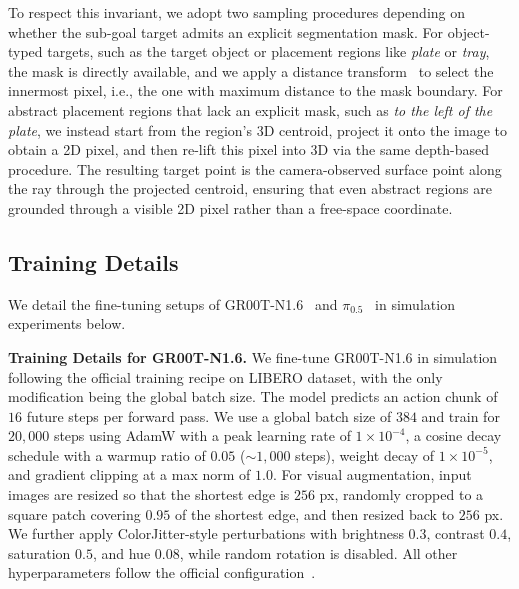 To respect this invariant, we adopt two sampling procedures depending on whether the sub-goal target admits an explicit segmentation mask. For object-typed targets, such as the target object or placement regions like \textit{plate} or \textit{tray}, the mask is directly available, and we apply a distance transform~\cite{distancetransform} to select the innermost pixel, i.e., the one with maximum distance to the mask boundary. For abstract placement regions that lack an explicit mask, such as \textit{to the left of the plate}, we instead start from the region's 3D centroid, project it onto the image to obtain a 2D pixel, and then re-lift this pixel into 3D via the same depth-based procedure. The resulting target point is the camera-observed surface point along the ray through the projected centroid, ensuring that even abstract regions are grounded through a visible 2D pixel rather than a free-space coordinate.

\subsection{Training Details}
\label{supp:sec:subsec:sim-training-details}
We detail the fine-tuning setups of GR00T-N1.6~\cite{gr00tn1_2025} and $\pi_{0.5}$~\cite{pi05} in simulation experiments below.

\noindent\textbf{Training Details for GR00T-N1.6.}
We fine-tune GR00T-N1.6 in simulation following the official training recipe on LIBERO dataset, with the only modification being the global batch size. The model predicts an action chunk of $16$ future steps per forward pass. We use a global batch size of $384$ and train for $20{,}000$ steps using AdamW with a peak learning rate of $1{\times}10^{-4}$, a cosine decay schedule with a warmup ratio of $0.05$ ($\sim\!1{,}000$ steps), weight decay of $1{\times}10^{-5}$, and gradient clipping at a max norm of $1.0$. For visual augmentation, input images are resized so that the shortest edge is $256$ px, randomly cropped to a square patch covering $0.95$ of the shortest edge, and then resized back to $256$ px. We further apply ColorJitter-style perturbations with brightness $0.3$, contrast $0.4$, saturation $0.5$, and hue $0.08$, while random rotation is disabled. All other hyperparameters follow the official configuration~\cite{gr00tn1_2025}.

